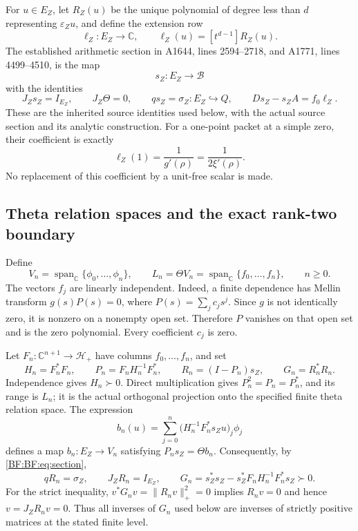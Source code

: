 For \(u\in E_Z\), let \(R_Z(u)\) be the unique polynomial of degree
less than \(d\) representing \(\varepsilon_Zu\), and define the
extension row
\begin{equation}
\ell_Z:E_Z\longrightarrow\mathbb C,\qquad
\ell_Z(u)=[t^{d-1}]R_Z(u).
\tag{BF.05}\label{BF:BF:eq:extension-row}
\end{equation}
The established arithmetic section in A1644, lines 2594--2718, and
A1771, lines 4499--4510, is the map
\[
s_Z:E_Z\longrightarrow\mathcal B
\]
with the identities
\begin{equation}
J_Zs_Z=I_{E_Z},\qquad J_Z\Theta=0,\qquad
qs_Z=\sigma_Z:E_Z\hookrightarrow Q,\qquad
Ds_Z-s_ZA=f_0\ell_Z.
\tag{BF.06}\label{BF:BF:eq:section}
\end{equation}
These are the inherited source identities used below, with the actual
source section and its analytic construction.  For a one-point packet
at a simple zero, their coefficient is exactly
\[
\ell_Z(1)=\frac{1}{g'(\rho)}
         =\frac{1}{2\xi'(\rho)}.
\]
No replacement of this coefficient by a unit-free scalar is made.

\subsection{Theta relation spaces and the exact rank-two boundary}
\label{BF:BF:rank-two}

Define
\begin{equation}
V_n=\operatorname{span}_{\mathbb C}\{\phi_0,\ldots,\phi_n\},
\qquad
L_n=\Theta V_n
   =\operatorname{span}_{\mathbb C}\{f_0,\ldots,f_n\},
\qquad n\ge0.
\tag{BF.07}\label{BF:BF:eq:relation-spaces}
\end{equation}
The vectors \(f_j\) are linearly independent.  Indeed, a finite
dependence has Mellin transform \(g(s)P(s)=0\), where
\(P(s)=\sum_jc_js^j\).  Since \(g\) is not identically zero, it is
nonzero on a nonempty open set.  Therefore \(P\) vanishes on that
open set and is the zero polynomial.  Every coefficient \(c_j\)
is zero.

Let \(F_n:\mathbb C^{n+1}\to\mathcal H_+\) have columns
\(f_0,\ldots,f_n\), and set
\begin{equation}
H_n=F_n^*F_n,\qquad
P_n=F_nH_n^{-1}F_n^*,\qquad
R_n=(I-P_n)s_Z,\qquad
G_n=R_n^*R_n.
\tag{BF.08}\label{BF:BF:eq:representatives}
\end{equation}
Independence gives \(H_n\succ0\).  Direct multiplication gives
\(P_n^2=P_n=P_n^*\), and its range is \(L_n\); it is the actual
orthogonal projection onto the specified finite theta relation space.
The expression
\[
b_n(u)=\sum_{j=0}^n
\bigl(H_n^{-1}F_n^*s_Zu\bigr)_j\phi_j
\]
defines a map \(b_n:E_Z\to V_n\) satisfying \(P_ns_Z=\Theta b_n\).
Consequently, by \eqref{BF:BF:eq:section},
\begin{equation}
qR_n=\sigma_Z,\qquad J_ZR_n=I_{E_Z},\qquad
G_n=s_Z^*s_Z-s_Z^*F_nH_n^{-1}F_n^*s_Z\succ0.
\tag{BF.09}\label{BF:BF:eq:exact-class}
\end{equation}
For the strict inequality, \(v^*G_nv=\|R_nv\|_+^2=0\) implies
\(R_nv=0\) and hence \(v=J_ZR_nv=0\).  Thus all inverses of \(G_n\)
used below are inverses of strictly positive matrices at the stated
finite level.

